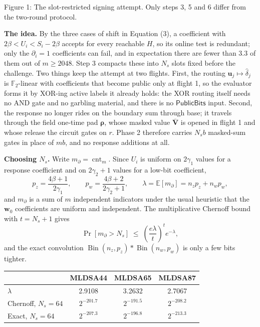 \documentclass[10pt,letterpaper]{article}
\newcommand{\vct}[1]{\bm{#1}}
\newcommand{\cnt}{\operatorname{cnt}}
\begin{document}
\begin{center}\small
Figure 1: The slot-restricted signing attempt. Only steps 3, 5 and 6 differ from the two-round protocol.
\end{center}

\textbf{The idea.} By the three cases of shift in Equation (3), a coefficient
with $2\beta<U_i<S_i-2\beta$ accepts for every reachable $H$, so its online test
is redundant; only the $\partial_i=1$ coefficients can fail, and in expectation
there are fewer than 3.3 of them out of $m\geq2048$. Step 3 compacts these into
$N_s$ slots fixed before the challenge. Two things keep the attempt at two flights.
First, the routing $\vct{u}_j\mapsto\widehat\delta_j$ is $\mathbb{F}_2$-linear
with coefficients that become public only at flight 1, so the evaluator forms it
by XOR-ing active labels it already holds: the XOR routing itself needs no AND
gate and no garbling material, and there is no $\mathsf{PublicBits}$ input.
Second, the response no longer rides on the boundary sum through base; it travels
through the field one-time pad $\vct{\rho}$, whose masked value $\bar{\vct{V}}$
is opened in flight 1 and whose release the circuit gates on $r$. Phase 2 therefore
carries $N_sb$ masked-sum gates in place of $mb$, and no response additions at all.
\newpage

\textbf{Choosing $N_s$.} Write $m_\partial=\cnt_m$. Since $U_i$ is uniform on
$2\gamma_1$ values for a response coefficient and on $2\gamma_2+1$ values for a
low-bit coefficient,
\[
p_z=\frac{4\beta+1}{2\gamma_1},\qquad
p_w=\frac{4\beta+2}{2\gamma_2+1},\qquad
\lambda=\mathbb{E}[m_\partial]=n_zp_z+n_wp_w,
\]
and $m_\partial$ is a sum of $m$ independent indicators under the usual heuristic
that the $\vct{w}_0$ coefficients are uniform and independent. The multiplicative
Chernoff bound with $t=N_s+1$ gives
\[
\Pr[m_\partial>N_s]\;\leq\;\left(\frac{e\lambda}{t}\right)^t e^{-\lambda},
\]
and the exact convolution $\operatorname{Bin}(n_z,p_z)*\operatorname{Bin}(n_w,p_w)$
is only a few bits tighter.

\begin{center}
\begin{tabular}{lccc}
\hline
 & MLDSA44 & MLDSA65 & MLDSA87\\\hline
$\lambda$ & 2.9108 & 3.2632 & 2.7067\\
Chernoff, $N_s=64$ & $2^{-201.7}$ & $2^{-191.5}$ & $2^{-208.2}$\\
Exact, $N_s=64$ & $2^{-207.3}$ & $2^{-196.8}$ & $2^{-213.3}$\\\hline
\end{tabular}
\end{center}
\end{document}
